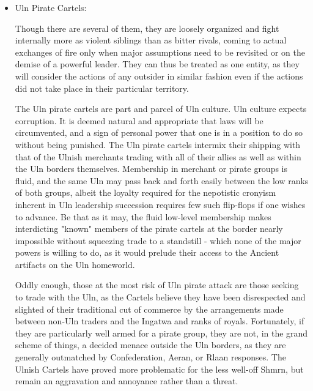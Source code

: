 \begin{itemize}
\item Uln Pirate Cartels:

Though there are several of them, they are loosely organized and fight
internally more as violent siblings than as bitter rivals, coming to
actual exchanges of fire only when major assumptions need to be
revisited or on the demise of a powerful leader. They can thus be
treated as one entity, as they will consider the actions of any
outsider in similar fashion even if the actions did not take place in
their particular territory.

The Uln pirate cartels are part and parcel of Uln culture. Uln culture
expects corruption. It is deemed natural and appropriate that laws
will be circumvented, and a sign of personal power that one is in a
position to do so without being punished. The Uln pirate cartels
intermix their shipping with that of the Ulnish merchants trading with
all of their allies as well as within the Uln borders
themselves. Membership in merchant or pirate groups is fluid, and the
same Uln may pass back and forth easily between the low ranks of both
groups, albeit the loyalty required for the nepotistic cronyism
inherent in Uln leadership succession requires few such flip-flops if
one wishes to advance. Be that as it may, the fluid low-level
membership makes interdicting "known" members of the pirate cartels at
the border nearly impossible without squeezing trade to a standstill -
which none of the major powers is willing to do, as it would prelude
their access to the Ancient artifacts on the Uln homeworld.

Oddly enough, those at the most risk of Uln pirate attack are those
seeking to trade with the Uln, as the Cartels believe they have been
disrespected and slighted of their traditional cut of commerce by the
arrangements made between non-Uln traders and the Ingatwa and ranks of
royals. Fortunately, if they are particularly well armed for a pirate
group, they are not, in the grand scheme of things, a decided menace
outside the Uln borders, as they are generally outmatched by
Confederation, Aeran, or Rlaan responses. The Ulnish Cartels have
proved more problematic for the less well-off Shmrn, but remain an
aggravation and annoyance rather than a threat.
\end{itemize}
